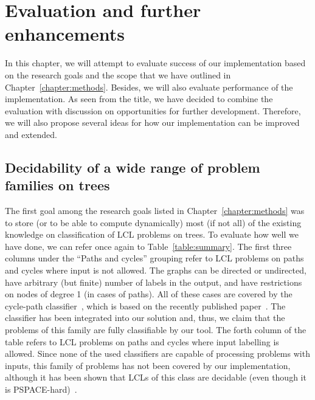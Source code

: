 \chapter{Evaluation and further enhancements}
\label{chapter:evaluation}

In this chapter, we will attempt to evaluate success of our implementation
based on the research goals and the scope that we have outlined in Chapter~\ref{chapter:methods}.
Besides, we will also evaluate performance of the implementation.
As seen from the title,
we have decided to combine the evaluation with discussion on opportunities for further
development. Therefore, we will also propose several ideas for how our implementation
can be improved and extended.

\section{Decidability of a wide range of problem families on trees}

The first goal among the research goals listed in Chapter~\ref{chapter:methods}
was to store (or to be able to compute dynamically) most
(if not all) of the existing knowledge on classification of LCL problems on trees.
To evaluate how well we have done, we can refer once again to Table~\ref{table:summary}.
The first three columns under the ``Paths and cycles'' grouping refer to LCL problems on
paths and cycles where input is not allowed. The graphs can be directed or undirected,
have arbitrary (but finite) number of labels in the output, and have restrictions
on nodes of degree 1 (in cases of paths). All of these cases are covered by
the cycle-path classifier~\cite{Tereshchenko2020}, which is based on the recently
published paper~\cite{Chang2020}. The classifier has been integrated into our
solution and, thus, we claim that the problems of this family are fully classifiable by our tool.
The forth column of the table refers to LCL problems on paths and cycles
where input labelling is allowed. Since none of the used classifiers
are capable of processing problems with inputs, this family of problems
has not been covered by our implementation, although it has been shown that
LCLs of this class are decidable (even though it is PSPACE-hard)~\cite{Balliu2018}.

